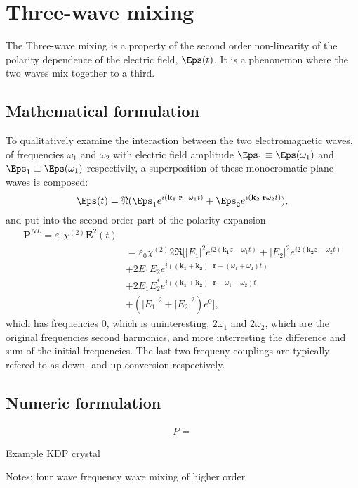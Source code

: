 \chapter{Three-wave mixing}
\label{cha:mixing}


The Three-wave mixing is a property of the second order non-linearity of the polarity dependence of the electric field, $\Eps(t)$. 
It is a phenonemon where the two waves mix together to a third. 



\section{Mathematical formulation}
\label{sec:mixing-math}

To qualitatively examine the interaction between the two electromagnetic waves, of frequencies $\omega_1$ and $\omega_2$ with electric field amplitude $\Eps_1  \equiv \Eps(\omega_1)$ and $\Eps_1  \equiv \Eps(\omega_1)$ respectivily, a superposition of these monocromatic plane waves is composed: 
\[
\mathbf{\Eps}(t) = \Re (\Eps_1e^{i(\mathbf{k_1} \cdot \mathbf{r} - \omega_1 t)}+\Eps_2e^{i(\mathbf{k_2} \cdot \mathbf{r} \omega_2 t)}),
\]
and put into the second order part of the polarity expansion
\begin{align}
\mathbf{P}^{NL}= \varepsilon_0 \chi^{(2)} \mathbf{E}^2(t) \\
&= \varepsilon_0 \chi^{(2)} 2 \Re [
|E_1|^2e^{i2(\mathbf{k_1} z - \omega_1t)}+|E_2|^2e^{i2(\mathbf{k_2} z - \omega_2t)}\\
& +2E_1E_2e^{i((\mathbf{k_1} + \mathbf{k_2}) \cdot \mathbf{r} - (\omega_1+\omega_2)t)}\\
& +2E_1E_2^*e^{i((\mathbf{k_1} + \mathbf{k_2}) \cdot \mathbf{r} - \omega_1-\omega_2)t}\\
& +\left(|E_1|^2+|E_2|^2\right)e^{0}],
\end{align}
which has frequencies $0$, which is uninteresting, $2\omega_1$ and $2\omega_2$, which are the original frequencies second harmonics, and more interresting the difference and sum of the initial frequencies. The last two frequeny couplings are typically refered to as down- and up-conversion respectively. 


\section{Numeric formulation}
\label{sec:mixing-numeric}

\begin{align}
P = 
\end{align}


Example KDP crystal

Notes:
four wave frequency wave mixing of higher order

